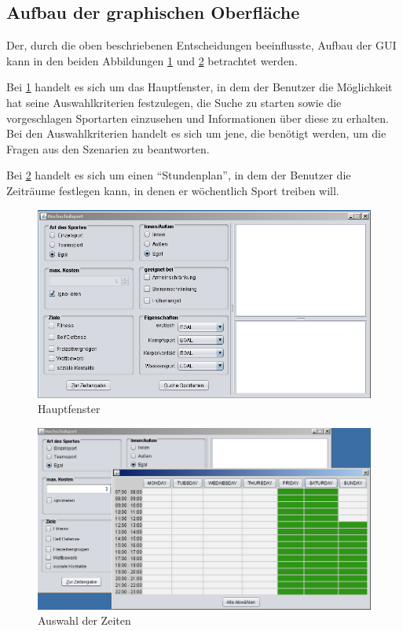 \subsection{Aufbau der graphischen Oberfläche}

Der, durch die oben beschriebenen Entscheidungen beeinflusste, Aufbau der GUI kann in den beiden Abbildungen \ref{GUI1} und \ref{GUI2} betrachtet werden.

Bei \ref{GUI1} handelt es sich um das Hauptfenster, in dem der Benutzer die Möglichkeit hat seine Auswahlkriterien festzulegen, die Suche zu starten sowie die vorgeschlagen Sportarten einzusehen und Informationen über diese zu erhalten. Bei den Auswahlkriterien handelt es sich um jene, die benötigt werden, um die Fragen aus den Szenarien zu beantworten.

Bei \ref{GUI2} handelt es sich um einen "`Stundenplan"', in dem der Benutzer die Zeiträume festlegen kann, in denen er wöchentlich Sport treiben will. 

\begin{figure}[htbp]%
\centering
\includegraphics[width=\textwidth]{images/gui.png}%
\caption{Hauptfenster}%
\label{GUI1}%
\end{figure}

\begin{figure}[htbp]%
\centering
\includegraphics[width=\textwidth]{images/guizeit.png}%
\caption{Auswahl der Zeiten}%
\label{GUI2}%
\end{figure}

